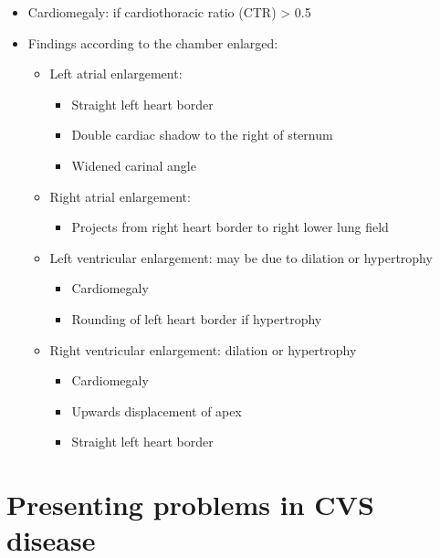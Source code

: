 \documentclass[
  12pt,
]{memoir}
\providecommand{\tightlist}{%
  \setlength{\itemsep}{0pt}\setlength{\parskip}{0pt}}
\begin{document}
\begin{itemize}
\tightlist
\item
  Cardiomegaly: if cardiothoracic ratio (CTR) \textgreater{} 0.5
\item
  Findings according to the chamber enlarged:

  \begin{itemize}
  \tightlist
  \item
    Left atrial enlargement:

    \begin{itemize}
    \tightlist
    \item
      Straight left heart border
    \item
      Double cardiac shadow to the right of sternum
    \item
      Widened carinal angle
    \end{itemize}
  \item
    Right atrial enlargement:

    \begin{itemize}
    \tightlist
    \item
      Projects from right heart border to right lower lung field
    \end{itemize}
  \item
    Left ventricular enlargement: may be due to dilation or hypertrophy

    \begin{itemize}
    \tightlist
    \item
      Cardiomegaly
    \item
      Rounding of left heart border if hypertrophy
    \end{itemize}
  \item
    Right ventricular enlargement: dilation or hypertrophy

    \begin{itemize}
    \tightlist
    \item
      Cardiomegaly
    \item
      Upwards displacement of apex
    \item
      Straight left heart border
    \end{itemize}
  \end{itemize}
\end{itemize}

\hypertarget{presenting-problems-in-cvs-disease}{%
\section{Presenting problems in CVS
disease}\label{presenting-problems-in-cvs-disease}}
\end{document}
